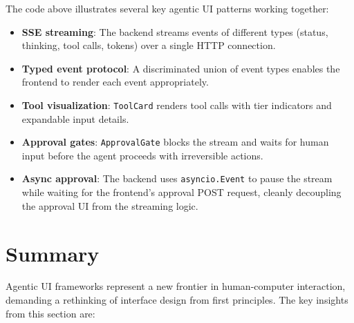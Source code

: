 \begin{examplebox}
The code above illustrates several key agentic UI patterns working together:

\begin{itemize}
  \item \textbf{SSE streaming}: The backend streams events of different types (status, thinking, tool calls, tokens) over a single HTTP connection.
  \item \textbf{Typed event protocol}: A discriminated union of event types enables the frontend to render each event appropriately.
  \item \textbf{Tool visualization}: \texttt{ToolCard} renders tool calls with tier indicators and expandable input details.
  \item \textbf{Approval gates}: \texttt{ApprovalGate} blocks the stream and waits for human input before the agent proceeds with irreversible actions.
  \item \textbf{Async approval}: The backend uses \texttt{asyncio.Event} to pause the stream while waiting for the frontend’s approval POST request, cleanly decoupling the approval UI from the streaming logic.
\end{itemize}
\end{examplebox}

\section{Summary}
\label{subsec:ui-summary}

Agentic UI frameworks represent a new frontier in human-computer interaction, demanding a rethinking of interface design from first principles. The key insights from this section are:

